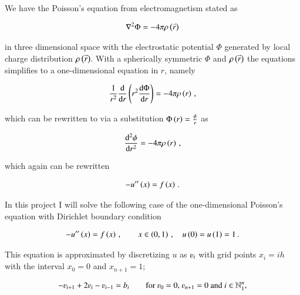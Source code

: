 \documentclass[11pt,english,a4paper]{article}
\begin{document}
\maketitle
\begin{flushleft}

\begin{abstract}

\end{abstract}

We have the Poisson's equation from electromagnetism stated as

\begin{align*}
\nabla^2 \Phi = - 4 \pi \rho\left({\accentset{\rightarrow}{r}}\right)
\end{align*}

in three dimensional space with the electrostatic potential $\Phi$ generated by local charge distribution $\rho\left({\accentset{\rightarrow}{r}}\right)$. With a spherically symmetric $\Phi$ and $\rho\left({\accentset{\rightarrow}{r}}\right)$ the equations simplifies to a one-dimensional equation in $r$, namely

\begin{align*}
\frac{1}{r^2}\frac{\mathrm{d}}{\mathrm{d}r}\left({r^2\frac{\mathrm{d}\Phi}{\mathrm{d}r}}\right) = -4 \pi \rho\left({r}\right) \,,
\end{align*}

which can be rewritten to via a substitution $\Phi\left({r}\right) = \frac{\phi}{r}$ as 

\begin{align*}
\frac{\mathrm{d}^2\phi}{\mathrm{d}r^2} = - 4\pi \rho\left({r}\right) \,,
\end{align*}

which again can be rewritten 

\begin{align*}
-u^{\prime\prime}\left({x}\right) = f\left({x}\right) \,.
\end{align*}

In this project I will solve the following case of the one-dimensional Poisson's equation with Dirichlet boundary condition

\begin{align}
-u^{\prime\prime}\left({x}\right) = f\left({x}\right)\,,  \qquad x\in\left({0,1}\right)\,,\quad u\left({0}\right) = u\left({1}\right) = 1 \,.
\label{eq_1}
\end{align}

This equation is approximated by discretizing $u$ as $\varv_i$ with grid points $x_i = i h$ with the interval $x_0 = 0$ and $x_{n+1}=1$;

\begin{align}
-\varv_{i+1} + 2 \varv_i - \varv_{i-1} = b_i \qquad \text{for $\varv_0 = 0$, $\varv_{n+1} = 0$ and $i\in\mathbb{N}_1^n$,}
\label{eq_2}
\end{align}


\end{flushleft}
\end{document}
